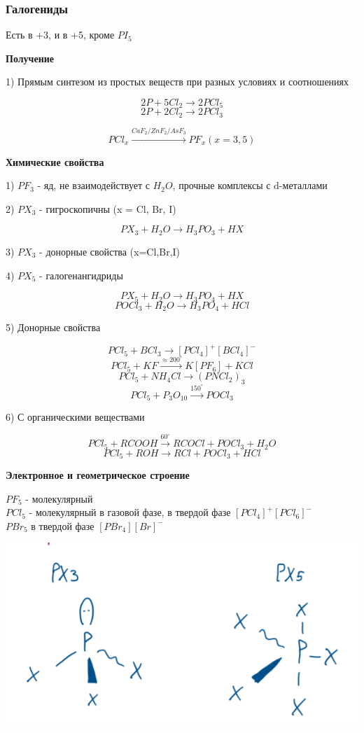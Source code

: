 \subsubsection*{Галогениды}

Есть в +3, и в +5, кроме $PI_5$

\textbf{Получение}

1) Прямым синтезом из простых веществ при разных условиях и соотношениях

$$2P + 5Cl_2 \rightarrow 2PCl_5$$
$$2P + 2Cl_2 \rightarrow 2PCl_3$$

$$PCl_x \xrightarrow{CaF_2/ZnF_2/AsF_3} PF_x(x=3,5)$$

\textbf{Химические свойства}

1) $PF_3$ - яд, не взаимодействует с $H_2O$, прочные комплексы с d-металлами

2) $PX_3$ - гигроскопичны (x = Cl, Br, I)

$$PX_3 + H_2O \rightarrow H_3PO_3 + HX$$

3) $PX_3$ - донорные свойства (x=Cl,Br,I)

4) $PX_5$ - галогенангидриды

$$PX_5 + H_2O \rightarrow H_3PO_4 + HX$$
$$POCl_3 + H_2O \rightarrow H_3PO_4 + HCl$$

5) Донорные свойства

$$PCl_5 + BCl_3 \rightarrow [PCl_4]^+[BCl_4]^-$$
$$PCl_5 + KF \xrightarrow{\approx 200^{\circ}} K[PF_6] + KCl$$
$$PCl_5 + NH_4Cl \rightarrow (PNCl_2)_3$$
$$PCl_5 + P_3O_10 \xrightarrow{150^{\circ}} POCl_3$$

6) С органическими веществами

$$PCl_5 + RCOOH \xrightarrow{60^{\circ}} RCOCl + POCl_3 + H_2O$$
$$PCl_5 + ROH \rightarrow RCl + POCl_3 + HCl$$

\textbf{Электронное и геометрическое строение}

$PF_5$ - молекулярный\\
$PCl_5$ - молекулярный в газовой фазе, в твердой фазе $[PCl_4]^{+}[PCl_6]^-$\\
$PBr_5$ в твердой фазе $[PBr_4][Br]^-$

\includegraphics{images/9v3.png}

